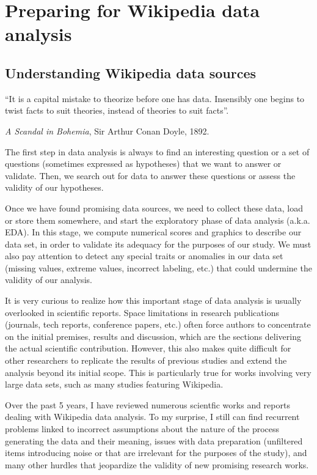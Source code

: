 

\part{Preparing for Wikipedia data analysis}


\chapter{Understanding Wikipedia data sources}

\setlength{\epigraphwidth}{.5\textwidth}
\epigraph{``It is a capital mistake to theorize before one has data. Insensibly 
 one begins to twist facts to suit theories, instead of theories to suit facts''.}
 {\textit{A Scandal in Bohemia}, Sir Arthur Conan Doyle, 1892.}

The first step in data analysis is always to find an interesting question or a
set of questions (sometimes expressed as hypotheses) that we want to answer 
or validate. Then, we search out for data to answer these questions or assess 
the validity of our hypotheses.

Once we have found promising data sources, we need to collect these data, load
or store them somewhere, and start the exploratory phase of data analysis (a.k.a.
EDA). In this stage, we compute numerical scores and graphics to describe our data set, in order to
validate its adequacy for the purposes of our study. We must also
pay attention to detect any special traits or anomalies in our data set (missing values, extreme
values, incorrect labeling, etc.) that could undermine the validity of our analysis.

It is very curious to realize how this important stage of data analysis is usually
overlooked in scientific reports. Space limitations in research publications
(journals, tech reports, conference papers, etc.) often force authors to
concentrate on the initial premises, results and discussion, which are the sections
delivering the actual scientific contribution. However, this also makes quite
difficult for other researchers to replicate the results of previous studies
and extend the analysis beyond its initial scope. This is particularly true for
works involving very large data sets, such as many studies featuring Wikipedia.

Over the past 5 years, I have reviewed numerous scientfic works and reports dealing
with Wikipedia data analysis. To my surprise, I still can find recurrent problems
linked to incorrect assumptions about the nature of the process generating the
data and their meaning, issues with data preparation (unfiltered items introducing
noise or that are irrelevant for the purposes of the study), and many other hurdles
that jeopardize the validity of new promising research works.

